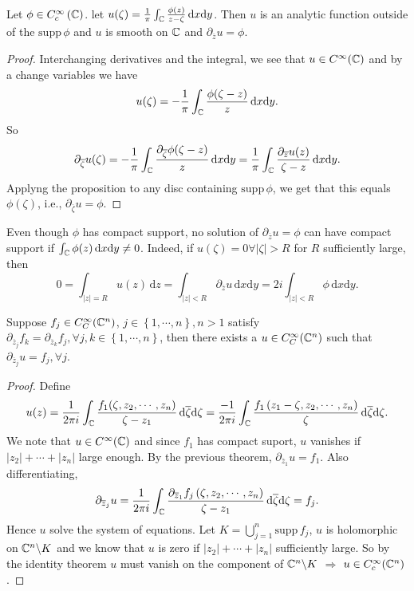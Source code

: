 \begin{theorem}
  Let $\phi \in C^{\infty}_c\left( \mathbb{C} \right) $. let $u(\zeta)=\frac{1}{\pi}\int_{\mathbb{C}}\frac{\phi(z)}{z-\zeta}\,\mathrm{d}x\mathrm{d}y$. Then $u$ is an analytic function outside of the $\mathrm{supp}\,\phi$ and $u$ is smooth on $\mathbb{C}$ and $\partial_{\overline{z}}u=\phi$.
\end{theorem}
\begin{proof}
  Interchanging derivatives and the integral, we see that $u\in C^{\infty}(\mathbb{C})$ and by a change variables we have
  \[
    u(\zeta)=-\frac{1}{\pi}\int_{\mathbb{C}}\frac{\phi(\zeta-z)}{z}\,\mathrm{d}x\mathrm{d}y.
  \] 
  So \[
    \partial_{\overline{\zeta}}u(\zeta)=-\frac{1}{\pi}\int_{\mathbb{C}}\frac{\partial_{\overline{\zeta}}\phi(\zeta-z)}{z}\,\mathrm{d}x\mathrm{d}y=\frac{1}{\pi}\int_{\mathbb{C}}\frac{\partial_{\overline{z}}u(z)}{\zeta-z}\,\mathrm{d}x\mathrm{d}y.
  \] 
  Applyng the proposition to any disc containing $\mathrm{supp}\,\phi$, we get that this equals $\phi(\zeta)$, i.e., $\partial_{\overline{\zeta}}u=\phi$.
\end{proof}
\begin{remark}
  Even though $\phi$ has compact support, no solution of $\partial_{\overline{z}}u=\phi$ can have compact support if $\int_{\mathbb{C}}\phi(z)\,\mathrm{d}x\mathrm{d}y\neq 0$. Indeed, if $u(\zeta)=0\forall|\zeta|>R$ for $R$ sufficiently large, then 
  \[
    0=\int_{|z|=R} u(z)\,\mathrm{d}z=\int_{|z|<R}\partial_{\overline{z}}u\,\mathrm{d}x\mathrm{d}y=2i \int_{|z|<R}\phi \, \mathrm{d}x\mathrm{d}y.
  \] 
\end{remark}
\begin{theorem}
  Suppose $f_j\in C_C^{\infty}(\mathbb{C}^{n})$, $ j\in \left\{1,\cdots ,n\right\} ,n>1$ satisfy $\partial_{\overline{z}_j}f_k=\partial_{\overline{z}_k}f_j,\forall j,k \in \left\{1,\cdots ,n\right\} $, then there exists a $u\in C_C^{\infty}(\mathbb{C}^{n})$ such that $\partial_{\overline{z}_j}u=f_j,\forall j$.
\end{theorem}
\begin{proof}
  Define $$u(z)=\frac{1}{2\pi i}\int_{\mathbb{C}} \frac{f_1(\zeta,z_2,\cdots ,z_n)}{\zeta-z_1}\,\mathrm{d} \overline{\zeta} \mathrm{d}\zeta=\frac{-1}{2\pi i}\int_{\mathbb{C}}\frac{f_1\left( z_1-\zeta,z_2,\cdots ,z_n \right) }{\zeta}\, \mathrm{d}\overline{\zeta}\mathrm{d}\zeta.$$
  We note that $u\in C^{\infty}(\mathbb{C})$ and since $f_1$ has compact suport, $u$ vanishes if $|z_2|+\cdots +|z_n|$ large enough.
  By the previous theorem, $\partial_{\overline{z}_1}u=f_1$. Also differentiating, 
  \[
    \partial_{\overline{z}_j}u=\frac{1}{2\pi i}\int_{\mathbb{C}}\frac{\partial_{\overline{z}_1}f_j\left(\zeta,z_2,\cdots ,z_n  \right) }{\zeta-z_1}\,\mathrm{d}\overline{\zeta}\mathrm{d}\zeta=f_j.
  \]
  Hence $u$ solve the system of equations. Let $K=\bigcup_{j=1} ^{n}\mathrm{supp}\,f_j$, $u$ is holomorphic on $\mathbb{C}^{n}\backslash  K$ and we know that $u$ is zero if $|z_2|+\cdots +|z_n|$ sufficiently large. So by the identity theorem $u$ must vanish on the component of $\mathbb{C}^{n}\backslash  K$ $\Rightarrow$ $u\in C_c^{\infty}(\mathbb{C}^{n})$.
\end{proof}

